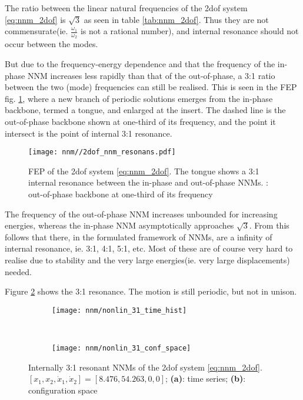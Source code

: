 The ratio between the linear natural frequencies of the 2dof system
\eqref{eq:nnm_2dof} is $\sqrt{3}$ as seen in table \ref{tab:nnm_2dof}. Thus they
are not commensurate(ie. $\frac{\omega_1}{\omega_2}$ is not a rational number),
and internal resonance should not occur between the modes.

But due to the frequency-energy dependence and that the frequency of the
in-phase NNM increases less rapidly than that of the out-of-phase, a 3:1 ratio
between the two (mode) frequencies can still be realised. This is seen in the
FEP fig. \ref{fig:nnm_fep_resonance}, where a new branch of periodic solutions
emerges from the in-phase backbone, termed a tongue, and enlarged at the insert.
The dashed line is the out-of-phase backbone shown at one-third of its
frequency, and the point it intersect is the point of internal 3:1 resonance.

\begin{figure}[!ht]
  \centering
  \texttt{[image: nnm//2dof\_nnm\_resonans.pdf]}
  \caption{FEP of the 2dof system \eqref{eq:nnm_2dof}. The tongue shows a 3:1
    internal resonance between the in-phase and out-of-phase NNMs.
    : out-of-phase backbone at one-third of its frequency}
  \label{fig:nnm_fep_resonance}
\end{figure}


The frequency of the out-of-phase NNM increases unbounded for increasing
energies, whereas the in-phase NNM asymptotically approaches $\sqrt{3}$. From
this follows that there, in the formulated framework of NNMs, are a infinity of
internal resonance, ie. 3:1, 4:1, 5:1, etc. Most of these are of course very
hard to realise due to stability and the very large energies(ie. very large
displacements) needed.


Figure \ref{fig:nnm_3:1_resonance} shows the 3:1 resonance. The motion is still
periodic, but not in unison.

\begin{figure}[!ht]
  \centering
  \begin{subfigure}[b]{0.45\textwidth}
    \texttt{[image: nnm/nonlin\_31\_time\_hist]}
  \end{subfigure}
  ~
  \begin{subfigure}[b]{0.45\textwidth}
    \texttt{[image: nnm/nonlin\_31\_conf\_space]}
  \end{subfigure}
  \caption{Internally 3:1 resonant NNMs of the 2dof system \eqref{eq:nnm_2dof}.
    $[x_1, x_2, \dot x_1, \dot x_2] = [8.476, 54.263, 0, 0]$;
    \textbf{(a)}: time series;
    \textbf{(b)}: configuration space}
  \label{fig:nnm_3:1_resonance}
\end{figure}


